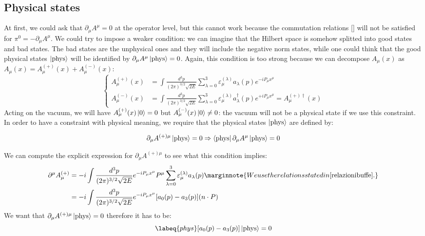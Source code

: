 \documentclass[../main.tex]{subfiles}
\begin{document}
\subsection{Physical states}
At first, we could ask that $\partial_\mu A^\mu=0$ at the operator level, but this cannot work because the commutation relations [] will not be satisfied for $\pi^0=-\partial_\mu A^\mu$. We could try to impose a weaker condition: we can imagine that the Hilbert space is somehow splitted into good states and bad states. The bad states are the unphysical ones and they will include the negative norm states, while one could think that the good physical states $\ket{\text{phys}}$ will be identified by $\partial_\mu A^\mu\ket{\text{phys}}=0$. Again, this condition is too strong because we can decompose $A_\mu(x)$ as $A_\mu(x)=A_\mu^{(+)}(x)+A_\mu^{(-)}(x)$:
\[
\left\{
\begin{aligned}
A_\mu^{(+)}(x)&=\int \frac{d^3p}{(2\pi)^{3/2}\sqrt{2E}}\sum_{\lambda=0}^3\varepsilon_\mu^{(\lambda)}a_\lambda(p)e^{-iP_\mu x^\mu}\\
A_\mu^{(-)}(x)&=\int \frac{d^3p}{(2\pi)^{3/2}\sqrt{2E}}\sum_{\lambda=0}^3\varepsilon_\mu^{(\lambda)}a^\dagger_\lambda(p)e^{+iP_\mu x^\mu}=A_\mu^{(+)\dagger}(x)
\end{aligned}
\right.
\]
Acting on the vacuum, we will have $A_\mu^{(+)}(x)\ket{0}=0$ but $A_\mu^{(-)}(x)\ket{0}\neq0$: the vacuum will not be a physical state if we use this constraint. In order to have a constraint with physical meaning, we require that the physical states $\ket{\text{phys}}$ are defined by:
\begin{kaobox}[frametitle=Gupta-Bleuler condition]
\[
\partial_\mu A^{(+)\mu}\ket{\text{phys}}=0\Rightarrow\bra{\text{phys}}\partial_\mu A^\mu\ket{\text{phys}}=0
\]
\end{kaobox}
We can compute the explicit expression for $\partial_\mu A^{(+)\mu}$ to see what this condition implies:
\begin{align*}
\partial^\mu A_\mu^{(+)}&=-i\int\frac{d^3p}{(2\pi)^{3/2}\sqrt{2E}}e^{-iP_\mu x^\mu}P^\mu\sum_{\lambda=0}^3\varepsilon_\mu^{(\lambda)}a_\lambda(p)\marginnote{We use the relations stated in \refeq{relazionibuffe}.}\\
&=-i\int\frac{d^3p}{(2\pi)^{3/2}\sqrt{2E}}e^{-iP_\mu x^\mu}[a_0(p)-a_3(p)](n \cdot P)
\end{align*}
We want that $\partial_\mu A^{(+)\mu}\ket{\text{phys}}=0$ therefore it has to be:
\begin{equation}
\labeq{phys}
[a_0(p)-a_3(p)]\ket{\text{phys}}=0
\end{equation}
\end{document}
